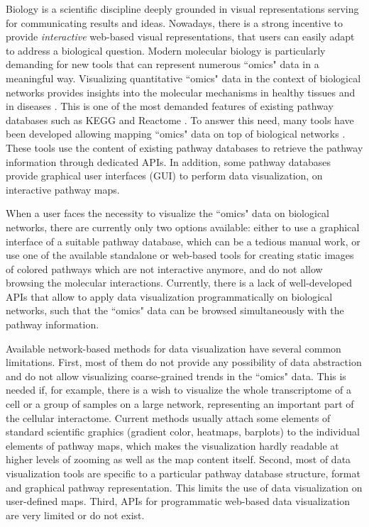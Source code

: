 \documentclass[a4,center,fleqn]{NAR}
\begin{document}
Biology is a scientific discipline deeply grounded in visual representations
serving for communicating results and ideas. Nowadays, there is a strong
incentive to provide \emph{interactive} web-based visual representations, that
users can easily adapt to address a biological question. Modern molecular
biology is particularly demanding for new tools that can represent numerous
``omics" data in a meaningful way.  Visualizing quantitative ``omics" data in
the context of biological networks provides insights into the molecular
mechanisms in healthy tissues and in diseases
\cite{Gehlenborg2010,Barillot2012}. This is one of the most demanded features
of existing pathway databases such as KEGG and Reactome \cite{Kanehisa2012,
Croft2014}. To answer this need, many tools have been developed allowing
mapping ``omics" data on top of biological networks
\cite{Arakawa2005,vanIersel2008,Luo2013, Nishida2014}. These tools use the
content of existing pathway databases to retrieve the pathway information
through dedicated APIs. In addition, some pathway databases provide graphical
user interfaces (GUI) to perform data visualization, on interactive
pathway maps.

When a user faces the necessity to visualize the ``omics" data on
biological networks, there are currently only two options available: either to use
a graphical interface of a suitable pathway database, which can be a tedious manual work, or use
one of the available standalone or web-based tools for creating static images
of colored pathways which are not interactive anymore, and do not allow browsing
the molecular interactions. Currently, there is a lack of well-developed APIs
that allow to apply data visualization programmatically on biological
networks, such that the ``omics" data can be browsed simultaneously with the
pathway information.

Available network-based methods for data visualization have several common
limitations. First, most of them do not provide any possibility of data
abstraction and do not allow visualizing coarse-grained trends in the ``omics" data.
This is needed if, for example, there is a wish to visualize the whole
transcriptome of a cell or a group of samples on a large network,
representing an important part of the cellular interactome. Current methods usually attach
some elements of standard scientific graphics (gradient color, heatmaps,
barplots) to the individual elements of pathway maps, which makes the
visualization hardly readable at higher levels of zooming as well as the map
content itself. Second, most of data visualization tools are specific to a
particular pathway database structure, format and graphical pathway
representation. This limits the use of data visualization on user-defined maps.
Third, APIs for programmatic web-based data
visualization are very limited or do not exist.
\end{document}
